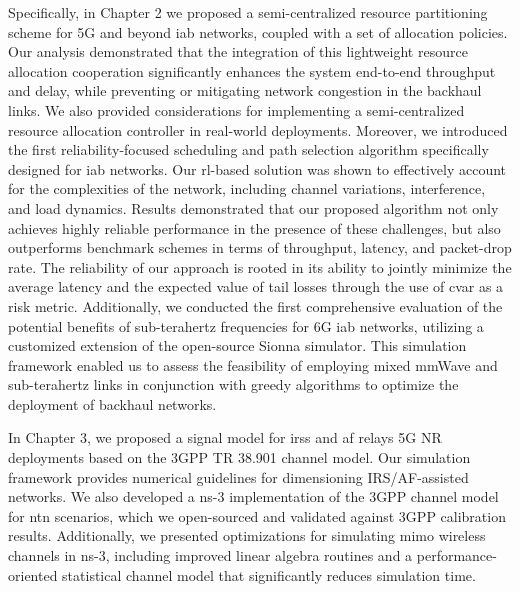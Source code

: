 Specifically, in Chapter 2 we proposed a semi-centralized resource partitioning scheme for 5G and beyond \gls{iab} networks, coupled with a set of allocation policies. Our analysis demonstrated that the integration of this lightweight resource allocation cooperation significantly enhances the system end-to-end throughput and delay, while preventing or mitigating network congestion in the backhaul links. We also provided considerations for implementing a semi-centralized resource allocation controller in real-world deployments. 
Moreover, we introduced the first reliability-focused scheduling and path selection algorithm specifically designed for \gls{iab} networks. Our \gls{rl}-based solution was shown to effectively account for the complexities of the network, including channel variations, interference, and load dynamics. Results demonstrated that our proposed algorithm not only achieves highly reliable performance in the presence of these challenges, but also outperforms benchmark schemes in terms of throughput, latency, and packet-drop rate. The reliability of our approach is rooted in its ability to jointly minimize the average latency and the expected value of tail losses through the use of \gls{cvar} as a risk metric.
Additionally, we conducted the first comprehensive evaluation of the potential benefits of sub-terahertz frequencies for 6G \gls{iab} networks, utilizing a customized extension of the open-source Sionna simulator. This simulation framework enabled us to assess the feasibility of employing mixed mmWave and sub-terahertz links in conjunction with greedy algorithms to optimize the deployment of backhaul networks.

In Chapter 3, we proposed a signal model for \glspl{irs} and \gls{af} relays 5G NR deployments based on the 3GPP TR 38.901 channel model. Our simulation framework provides numerical guidelines for dimensioning IRS/AF-assisted networks. We also developed a ns-3 implementation of the 3GPP channel model for \gls{ntn} scenarios, which we open-sourced and validated against 3GPP calibration results. Additionally, we presented optimizations for simulating \gls{mimo} wireless channels in ns-3, including improved linear algebra routines and a performance-oriented statistical channel model that significantly reduces simulation time.

